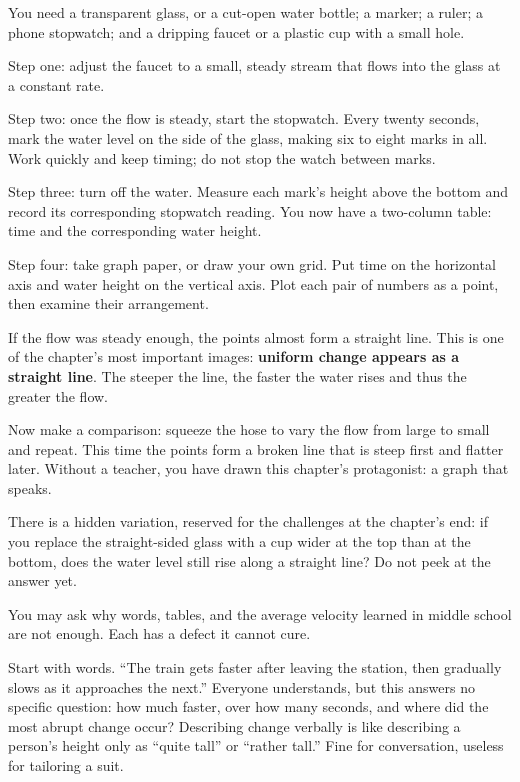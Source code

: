 \begin{experiment}
You need a transparent glass, or a cut-open water bottle; a marker; a ruler; a phone stopwatch; and a dripping faucet or a plastic cup with a small hole.

Step one: adjust the faucet to a small, steady stream that flows into the glass at a constant rate.

Step two: once the flow is steady, start the stopwatch. Every twenty seconds, mark the water level on the side of the glass, making six to eight marks in all. Work quickly and keep timing; do not stop the watch between marks.

Step three: turn off the water. Measure each mark's height above the bottom and record its corresponding stopwatch reading. You now have a two-column table: time and the corresponding water height.

Step four: take graph paper, or draw your own grid. Put time on the horizontal axis and water height on the vertical axis. Plot each pair of numbers as a point, then examine their arrangement.

If the flow was steady enough, the points almost form a straight line. This is one of the chapter's most important images: \textbf{uniform change appears as a straight line}. The steeper the line, the faster the water rises and thus the greater the flow.

Now make a comparison: squeeze the hose to vary the flow from large to small and repeat. This time the points form a broken line that is steep first and flatter later. Without a teacher, you have drawn this chapter's protagonist: a graph that speaks.
\end{experiment}

There is a hidden variation, reserved for the challenges at the chapter's end: if you replace the straight-sided glass with a cup wider at the top than at the bottom, does the water level still rise along a straight line? Do not peek at the answer yet.


You may ask why words, tables, and the average velocity learned in middle school are not enough. Each has a defect it cannot cure.

Start with words. ``The train gets faster after leaving the station, then gradually slows as it approaches the next.'' Everyone understands, but this answers no specific question: how much faster, over how many seconds, and where did the most abrupt change occur? Describing change verbally is like describing a person's height only as ``quite tall'' or ``rather tall.'' Fine for conversation, useless for tailoring a suit.

